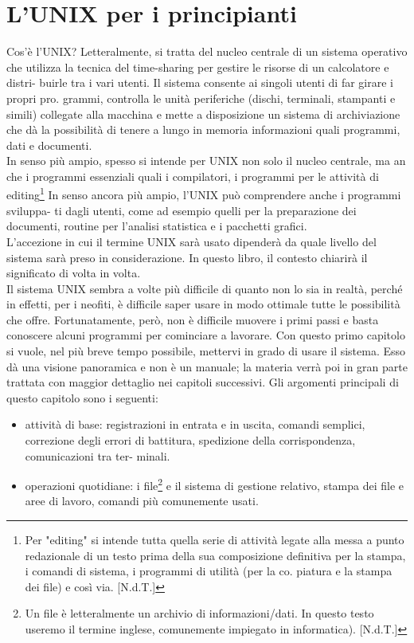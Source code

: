 \chapter{L'UNIX per i principianti}
Cos'è l'UNIX? Letteralmente, si tratta del nucleo centrale di un sistema operativo
che utilizza la tecnica del time-sharing per gestire le risorse di un calcolatore e distri-
buirle tra i vari utenti. Il sistema consente ai singoli utenti di far girare i propri pro.
grammi, controlla le unità periferiche (dischi, terminali, stampanti e simili) collegate
alla macchina e mette a disposizione un sistema di archiviazione che dà la possibilità
di tenere a lungo in memoria informazioni quali programmi, dati e documenti.\\
In senso più ampio, spesso si intende per UNIX non solo il nucleo centrale, ma an
che i programmi essenziali quali i compilatori, i programmi per le attività di editing\footnote{Per "editing" si 
	intende tutta quella serie di attività legate alla messa a punto redazionale di un testo prima della sua 
	composizione definitiva per la stampa, i comandi di sistema, i programmi di utilità (per la co.
	piatura e la stampa dei file) e così via. [N.d.T.]}
In senso ancora più ampio, l'UNIX può comprendere anche i programmi sviluppa-
ti dagli utenti, come ad esempio quelli per la preparazione dei documenti, routine per
l'analisi statistica e i pacchetti grafici.\\
L'accezione in cui il termine UNIX sarà usato dipenderà da quale livello del sistema sarà preso in considerazione. In questo libro, il contesto chiarirà il significato di
volta in volta.\\
Il sistema UNIX sembra a volte più difficile di quanto non lo sia in realtà, perché
in effetti, per i neofiti, è difficile saper usare in modo ottimale tutte le possibilità che
offre. Fortunatamente, però, non è difficile muovere i primi passi e basta conoscere
alcuni programmi per cominciare a lavorare. Con questo primo capitolo si vuole, nel
più breve tempo possibile, mettervi in grado di usare il sistema. Esso dà una visione
panoramica e non è un manuale; la materia verrà poi in gran parte trattata con maggior
dettaglio nei capitoli successivi.
Gli argomenti principali di questo capitolo sono i seguenti:
\begin{itemize}
	\item attività di base: registrazioni in entrata e in uscita, comandi semplici, correzione
	degli errori di battitura, spedizione della corrispondenza, comunicazioni tra ter-
	minali.
	\item operazioni quotidiane: i file\footnote{Un file è letteralmente un archivio di informazioni/dati.
		In questo testo useremo il termine inglese, comunemente impiegato in informatica). [N.d.T.]} e
	il sistema di gestione relativo, stampa dei file e aree di lavoro, comandi più comunemente usati.
\end{itemize}
